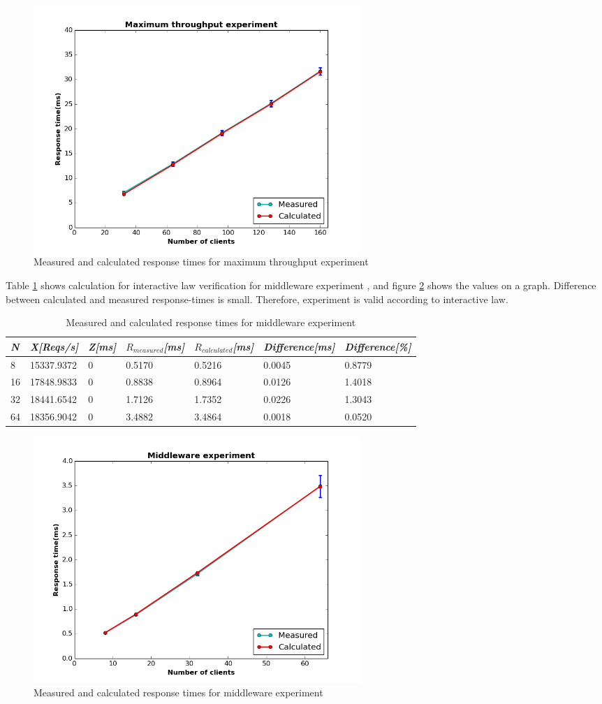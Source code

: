 \documentclass[11pt]{article}
\begin{document}
\begin{figure}[H]
  \includegraphics[width=0.6\textwidth,page=1]{figures/interactive_law/maxThroughput}
  \centering
  \caption{Measured and calculated response times for maximum throughput experiment}
  \label{fig:interactive-max}
\end{figure}


Table \ref{tbl:interactive-middleware} shows calculation for 
interactive law verification for middleware experiment \cite[section~1.2.4]{ms1}, and 
figure \ref{fig:interactive-middleware} shows the values on a graph. Difference between calculated and 
measured response-times is small. Therefore, experiment is valid according to interactive law.


\begin{table}[!ht]
  \begin{tabular}{*7l}    \toprule
    \emph{N}   & \emph{X[Reqs/s]} & \emph{Z[ms]} & \emph{$R_{measured}$[ms]} & \emph{$R_{calculated}$[ms]} &   \emph{Difference[ms]} & \emph{Difference[\%]} \\\midrule
   8 & 15337.9372 & 0  & 0.5170 & 0.5216& 0.0045 & 0.8779 \\
   16& 17848.9833 & 0  & 0.8838 & 0.8964& 0.0126&  1.4018 \\
   32& 18441.6542 & 0  & 1.7126 & 1.7352& 0.0226&  1.3043 \\
   64& 18356.9042 & 0  & 3.4882 & 3.4864& 0.0018&  0.0520\\
    \hline
  \end{tabular}
  \centering
  \caption{Measured and calculated response times for middleware experiment}
  \label{tbl:interactive-middleware}
\end{table}


\begin{figure}[H]
  \includegraphics[width=0.6\textwidth,page=1]{figures/interactive_law/middleware}
  \centering
  \caption{Measured and calculated response times for middleware experiment}
  \label{fig:interactive-middleware}
\end{figure}
\end{document}
